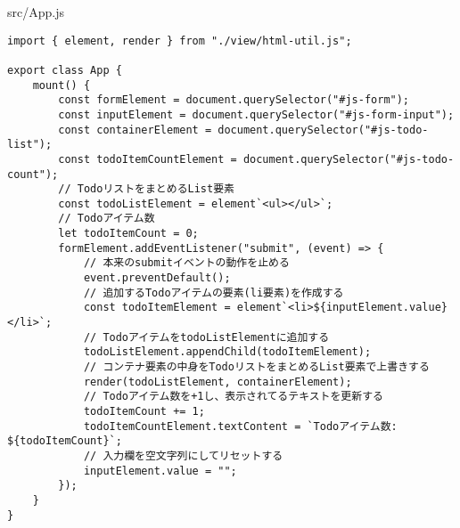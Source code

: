 \begin{listtitle}
src/App.js
\end{listtitle}
\begin{lstlisting}
import { element, render } from "./view/html-util.js";

export class App {
    mount() {
        const formElement = document.querySelector("#js-form");
        const inputElement = document.querySelector("#js-form-input");
        const containerElement = document.querySelector("#js-todo-list");
        const todoItemCountElement = document.querySelector("#js-todo-count");
        // TodoリストをまとめるList要素
        const todoListElement = element`<ul></ul>`;
        // Todoアイテム数
        let todoItemCount = 0;
        formElement.addEventListener("submit", (event) => {
            // 本来のsubmitイベントの動作を止める
            event.preventDefault();
            // 追加するTodoアイテムの要素(li要素)を作成する
            const todoItemElement = element`<li>${inputElement.value}</li>`;
            // TodoアイテムをtodoListElementに追加する
            todoListElement.appendChild(todoItemElement);
            // コンテナ要素の中身をTodoリストをまとめるList要素で上書きする
            render(todoListElement, containerElement);
            // Todoアイテム数を+1し、表示されてるテキストを更新する
            todoItemCount += 1;
            todoItemCountElement.textContent = `Todoアイテム数: ${todoItemCount}`;
            // 入力欄を空文字列にしてリセットする
            inputElement.value = "";
        });
    }
}
\end{lstlisting}
\listend
